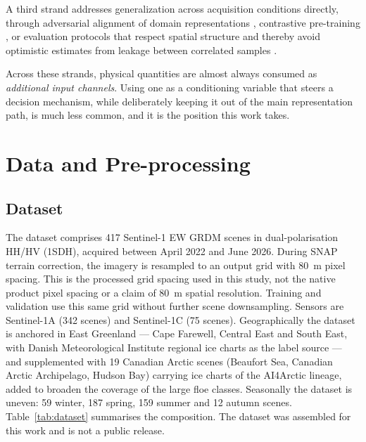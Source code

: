 \documentclass[preprint,12pt,authoryear]{elsarticle}
\begin{document}
A third strand addresses generalization across acquisition conditions directly,
through adversarial alignment of domain representations \citep{ganin2016dann},
contrastive pre-training \citep{chen2020simclr}, or evaluation protocols that
respect spatial structure and thereby avoid optimistic estimates from leakage
between correlated samples \citep{roberts2017crossvalidation,jalayer2025enhancing}.

Across these strands, physical quantities are almost always consumed as
\emph{additional input channels}. Using one as a conditioning variable that
steers a decision mechanism, while deliberately keeping it out of the main
representation path, is much less common, and it is the position this work takes.

\section{Data and Pre-processing}
\label{sec:data}

\subsection{Dataset}

The dataset comprises 417 Sentinel-1 EW GRDM scenes in dual-polarisation HH/HV
(1SDH), acquired between April 2022 and June 2026. During SNAP terrain
correction, the imagery is resampled to an output grid with 80~m pixel
spacing. This is the processed grid spacing used in this study, not the
native product pixel spacing or a claim of 80~m spatial resolution.
Training and validation use this same grid without further scene
downsampling. Sensors are Sentinel-1A (342 scenes) and Sentinel-1C (75 scenes).
Geographically the dataset is anchored in East Greenland --- Cape Farewell,
Central East and South East, with Danish Meteorological Institute regional ice
charts as the label source --- and supplemented with 19 Canadian Arctic scenes
(Beaufort Sea, Canadian Arctic Archipelago, Hudson Bay) carrying ice charts of
the AI4Arctic lineage, added to broaden the coverage of the large floe classes.
Seasonally the dataset is uneven: 59 winter, 187 spring, 159 summer and
12 autumn scenes. Table~\ref{tab:dataset} summarises the composition. The
dataset was assembled for this work and is not a public release.
\end{document}
